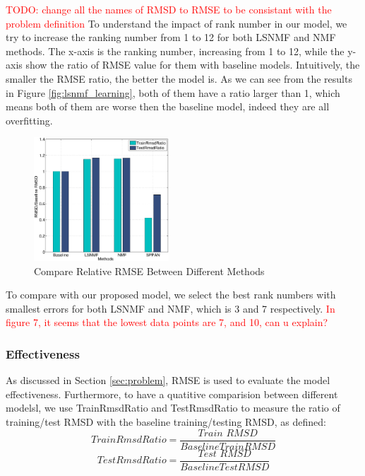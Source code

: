 \textcolor{red}{TODO: change all the names of RMSD to RMSE to be
  consistant with the problem definition} To understand the impact of
rank number in our model, we try to increase the ranking number from 1
to 12 for both LSNMF and NMF methods.  The x-axis is the ranking
number, increasing from 1 to 12, while the y-axis show the ratio of
RMSE value for them with baseline models. Intuitively, the smaller the
RMSE ratio, the better the model is.  As we can see from the results
in Figure \ref{fig:lsnmf_learning}, both of them have a ratio larger
than 1, which means both of them are worse then the baseline model,
indeed they are all overfitting.


\begin{figure}[!ht]
  \centering
  \includegraphics[width=0.45\textwidth]{figures/methos_comparison_all_relative.eps}
  \caption{Compare Relative RMSE Between Different Methods}
  \label{fig:rmsd_compare}
\end{figure}

To compare with our proposed {\sppan} model, we select the best rank
numbers with smallest errors for both LSNMF and NMF, which is 3 and 7
respectively.  \textcolor{red}{In figure 7, it seems that the lowest
  data points are 7, and 10, can u explain?}


\subsubsection{Effectiveness}

As discussed in Section \ref{sec:problem}, RMSE is used to evaluate
the model effectiveness. Furthermore, to have a quatitive comparision
between different modelsl, we use TrainRmsdRatio and TestRmsdRatio to
measure the ratio of training/test RMSD with the baseline
training/testing RMSD, as defined:
\[
TrainRmsdRatio=\frac{\textit{Train RMSD}}{Baseline Train RMSD}
\]
\[
TestRmsdRatio=\frac{\textit{Test RMSD}}{Baseline Test RMSD}
\]

